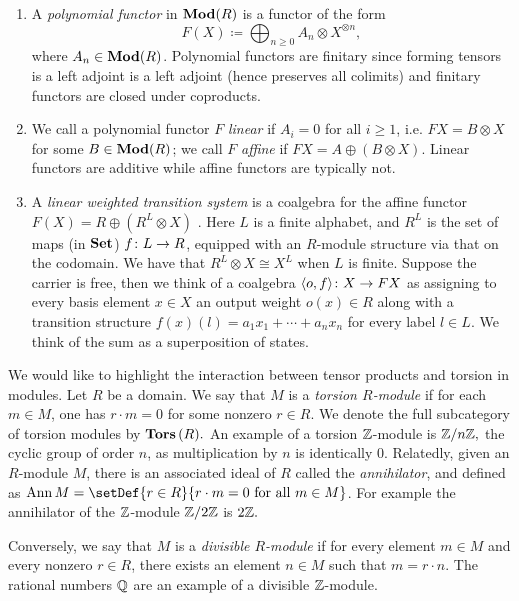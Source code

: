 \documentclass[runningheads]{llncs}
\begin{document}
\begin{example}
 \label{ex:polynomial}
\begin{enumerate}
\item
A \emph{polynomial functor} in $\operatorname{\mathbf{Mod}}(R)$ is a functor of the form 
\begin{equation*}
F(X) \coloneqq \bigoplus_{n \geq 0} A_n \otimes X^{\otimes n}, 
\end{equation*}
where $A_n \in \operatorname{\mathbf{Mod}}(R)$.
Polynomial functors are finitary since forming tensors is a left adjoint is a left adjoint (hence preserves all colimits) and finitary functors are closed under coproducts. 
\item
We call a polynomial functor $F$ \emph{linear} if $A_i = 0$ for all $i\geq 1$, i.e. $FX = B\otimes X$ for some $B\in\operatorname{\mathbf{Mod}}(R)$; we call $F$ \emph{affine} if $FX = A \oplus( B\otimes X)$.  
Linear functors are additive while affine functors are typically not.
 \item
A \emph{linear weighted transition system} is a coalgebra for the affine functor $F(X) = R \oplus(R^{L} \otimes X)$ \cite{bonchi12, Bhaduri23}.  Here $L$ is a finite alphabet, and $R^{L}$ is the set of maps (in $\mathbf{Set}$) $f \colon L \to R$, equipped with an $R$-module structure via that on the codomain. We have that $R^{L} \otimes X \cong X^L$ when $L$ is finite. Suppose the carrier is free, then we think of a coalgebra $\langle o, f \rangle \colon X \to FX$ as assigning to every basis element $x\in X$ an output weight $o(x)\in R$ along with a transition structure $f(x)(l) = a_1 x_1 + \cdots + a_n x_n$  for every label  $l \in L$. We think of the sum as a superposition of states.
\end{enumerate}
\end{example}

We would like to highlight the interaction between tensor products and torsion in modules.
Let $R$ be a domain.
We say that $M$ is a \emph{torsion $R$-module} if for each $m\in M$, one has $r\cdot m = 0$ for some nonzero $r\in R$.
 We denote the full subcategory of torsion modules by $ \operatorname{\mathbf{Tors}}{(R)}.$ An example of a torsion $\mathbb{Z}$-module is $ \mathbb{Z}/ n\mathbb{Z},$ the cyclic group of order $n$, as multiplication by $n$ is identically 0.
Relatedly, given an $R$-module $M$, there  is an associated ideal of $R$ called the \emph{annihilator}, and defined as $\Ann M = \setDef{r\in R}{ r\cdot m =0 \mbox{ for all } m\in M}$. For example the annihilator of the $\mathbb{Z}$-module $\mathbb{Z}/2\mathbb{Z}$ is $2\mathbb{Z}.$



 Conversely, we say that $M$ is a \emph{divisible $R$-module} if for every element $m \in M$ and every nonzero $r\in R$, there exists an element $n\in M$ such that $m = r\cdot n$.  
The rational numbers $\mathbb{Q}$ are an example of a divisible $\mathbb{Z}$-module.
\end{document}
